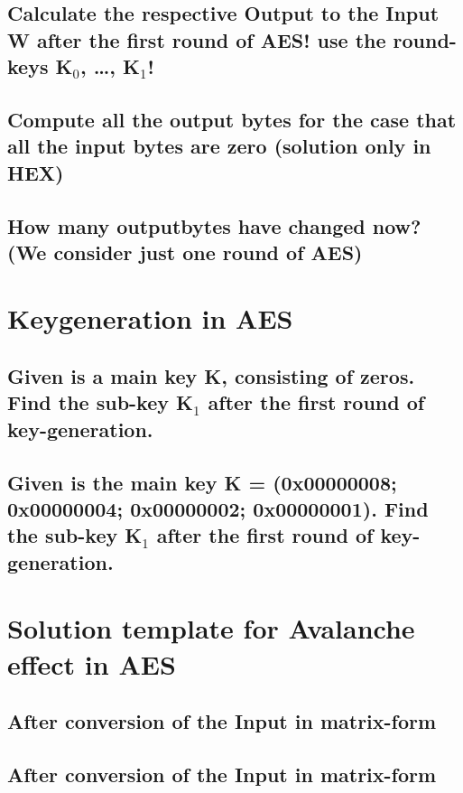\subsection{Calculate the respective Output to the Input W after the first round of AES! use the round-keys K$_{0}$, \ldots, K$_{1}$!}
\label{section:4a}

\subsection{Compute all the output bytes for the case that all the input bytes are zero (solution only in HEX)}
\label{section:4b}

\subsection{How many outputbytes have changed now? (We consider just one round of AES)}
\label{section:4c}

\section{Keygeneration in AES}

\subsection{Given is a main key K, consisting of zeros. Find the sub-key K$_{1}$ after the first round of key-generation.}
\label{section:5a}

\subsection{Given is the main key K = (0x00000008; 0x00000004; 0x00000002; 0x00000001). Find the sub-key K$_{1}$ after the first round of key-generation.}
\label{section:5b}

\section{Solution template for Avalanche effect in AES}

\subsection{After conversion of the Input in matrix-form}
\label{section:6a}

\subsection{After conversion of the Input in matrix-form}
\label{section:6b}
